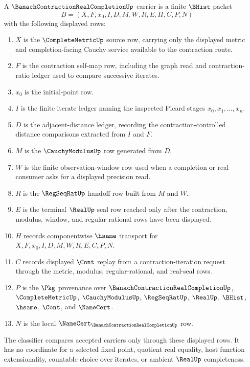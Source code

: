 \begin{definition}
\label{def:banach-contraction-real-completion-carrier}
A $\BanachContractionRealCompletionUp$ carrier is a finite $\BHist$ packet
$$
B=(X,F,x_0,I,D,M,W,R,E,H,C,P,N)
$$
with the following displayed rows:
\begin{enumerate}
\item $X$ is the $\CompleteMetricUp$ source row, carrying only the displayed metric and completion-facing Cauchy service available to the contraction route.
\item $F$ is the contraction self-map row, including the graph read and contraction-ratio ledger used to compare successive iterates.
\item $x_0$ is the initial-point row.
\item $I$ is the finite iterate ledger naming the inspected Picard stages $x_0,x_1,\ldots,x_n$.
\item $D$ is the adjacent-distance ledger, recording the contraction-controlled distance comparisons extracted from $I$ and $F$.
\item $M$ is the $\CauchyModulusUp$ row generated from $D$.
\item $W$ is the finite observation-window row used when a completion or real consumer asks for a displayed precision read.
\item $R$ is the $\RegSeqRatUp$ handoff row built from $M$ and $W$.
\item $E$ is the terminal $\RealUp$ seal row reached only after the contraction, modulus, window, and regular-rational rows have been displayed.
\item $H$ records componentwise $\hsame$ transport for $X,F,x_0,I,D,M,W,R,E,C,P,N$.
\item $C$ records displayed $\Cont$ replay from a contraction-iteration request through the metric, modulus, regular-rational, and real-seal rows.
\item $P$ is the $\Pkg$ provenance over $\BanachContractionRealCompletionUp$, $\CompleteMetricUp$, $\CauchyModulusUp$, $\RegSeqRatUp$, $\RealUp$, $\BHist$, $\hsame$, $\Cont$, and $\NameCert$.
\item $N$ is the local $\NameCert_{\BanachContractionRealCompletionUp}$ row.
\end{enumerate}
The classifier compares accepted carriers only through these displayed rows. It has no coordinate for a selected fixed point, quotient real equality, host function extensionality, countable choice over iterates, or ambient $\RealUp$ completeness.
\end{definition}


